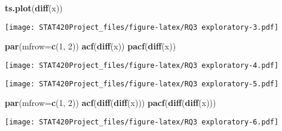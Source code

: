 \documentclass[]{article}
\newenvironment{Shaded}{\begin{snugshade}}{\end{snugshade}}
\newcommand{\CommentTok}[1]{\textcolor[rgb]{0.56,0.35,0.01}{\textit{#1}}}
\newcommand{\DataTypeTok}[1]{\textcolor[rgb]{0.13,0.29,0.53}{#1}}
\newcommand{\DecValTok}[1]{\textcolor[rgb]{0.00,0.00,0.81}{#1}}
\newcommand{\KeywordTok}[1]{\textcolor[rgb]{0.13,0.29,0.53}{\textbf{#1}}}
\newcommand{\NormalTok}[1]{#1}
\begin{document}
\begin{Shaded}
\begin{Highlighting}[]
\KeywordTok{ts.plot}\NormalTok{(}\KeywordTok{diff}\NormalTok{(x))}
\end{Highlighting}
\end{Shaded}

\texttt{[image: STAT420Project\_files/figure-latex/RQ3 exploratory-3.pdf]}

\begin{Shaded}
\begin{Highlighting}[]
\KeywordTok{par}\NormalTok{(}\DataTypeTok{mfrow=}\KeywordTok{c}\NormalTok{(}\DecValTok{1}\NormalTok{, }\DecValTok{2}\NormalTok{))}
\KeywordTok{acf}\NormalTok{(}\KeywordTok{diff}\NormalTok{(x))}
\KeywordTok{pacf}\NormalTok{(}\KeywordTok{diff}\NormalTok{(x))}
\end{Highlighting}
\end{Shaded}

\texttt{[image: STAT420Project\_files/figure-latex/RQ3 exploratory-4.pdf]}

\begin{Shaded}
\end{Shaded}

\texttt{[image: STAT420Project\_files/figure-latex/RQ3 exploratory-5.pdf]}

\begin{Shaded}
\begin{Highlighting}[]
\KeywordTok{par}\NormalTok{(}\DataTypeTok{mfrow=}\KeywordTok{c}\NormalTok{(}\DecValTok{1}\NormalTok{, }\DecValTok{2}\NormalTok{))}
\KeywordTok{acf}\NormalTok{(}\KeywordTok{diff}\NormalTok{(}\KeywordTok{diff}\NormalTok{(x)))}
\KeywordTok{pacf}\NormalTok{(}\KeywordTok{diff}\NormalTok{(}\KeywordTok{diff}\NormalTok{(x)))}
\end{Highlighting}
\end{Shaded}

\texttt{[image: STAT420Project\_files/figure-latex/RQ3 exploratory-6.pdf]}
\end{document}
